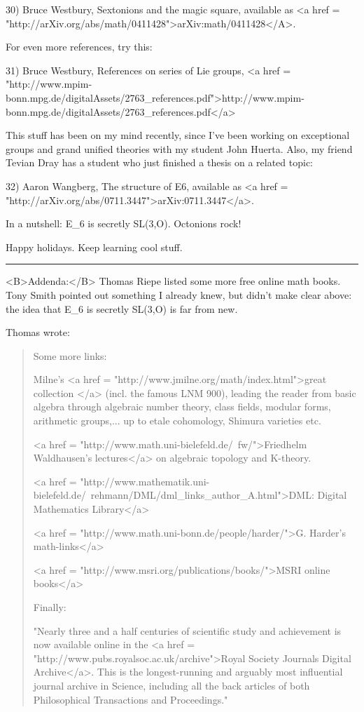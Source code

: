 30) Bruce Westbury, Sextonions and the magic square, available
as <a href = "http://arXiv.org/abs/math/0411428">arXiv:math/0411428</A>.

For even more references, try this:

31) Bruce Westbury, References on series of Lie groups,
<a href = "http://www.mpim-bonn.mpg.de/digitalAssets/2763_references.pdf">http://www.mpim-bonn.mpg.de/digitalAssets/2763_references.pdf</a>

This stuff has been on my mind recently, since I've been working on
exceptional groups and grand unified theories with my student
John Huerta.  Also, my friend Tevian Dray has a student who just 
finished a thesis on a related topic:

32) Aaron Wangberg, The structure of E6,
available as <a href = "http://arXiv.org/abs/0711.3447">arXiv:0711.3447</a>.

In a nutshell: E_{6} is secretly SL(3,O).  Octonions rock!

Happy holidays.  Keep learning cool stuff.

\par\noindent\rule{\textwidth}{0.4pt}
<B>Addenda:</B> Thomas Riepe listed some more free online math books.
Tony Smith pointed out something I already knew, but didn't make clear
above: the idea that E_{6} is secretly SL(3,O) is far from new.

Thomas wrote:

\begin{quote}
  Some more links:

  Milne's <a href = "http://www.jmilne.org/math/index.html">great
  collection </a> (incl. the famous LNM 900), leading the reader from
  basic algebra through algebraic number theory, class fields, modular
  forms, arithmetic groups,... up to etale cohomology, Shimura
  varieties etc.

<a href = "http://www.math.uni-bielefeld.de/~fw/">Friedhelm Waldhausen's lectures</a> on algebraic topology and K-theory.  

<a href = "http://www.mathematik.uni-bielefeld.de/~rehmann/DML/dml_links_author_A.html">DML: Digital Mathematics Library</a> 

<a href = "http://www.math.uni-bonn.de/people/harder/">G. Harder's math-links</a>

<a href = "http://www.msri.org/publications/books/">MSRI online books</a> 

Finally:

"Nearly three and a half centuries of scientific study and achievement is now available online in the <a href = "http://www.pubs.royalsoc.ac.uk/archive">Royal Society Journals Digital Archive</a>. This is the longest-running and arguably most influential journal archive in Science, including all the back articles of both Philosophical Transactions and Proceedings."
\end{quote}


